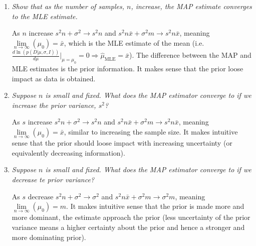 \begin{example}
\begin{enumerate}
		\item \emph{Show that as the number of samples, $n$, increase, the MAP estimate converges to the MLE estimate.}\newline
		
		As $n$ increase $s^2n+\sigma^2\rightarrow s^2n$ and $s^2n\bar{x}+\sigma^2m\rightarrow s^2n\bar{x}$, meaning $\lim\limits_{n\rightarrow \infty}(\mu_0) = \bar{x}$, which is the MLE estimate of the mean (i.e. $\frac{d\ln(p(D|\mu,\sigma,I))}{d\mu}\bigg|_{\mu=\mu_0}=0\Rightarrow \hat{\mu}_{\text{MLE}}=\bar{x}$). The difference between the MAP and MLE estimates is the prior information. It makes sense that the prior loose impact as data is obtained.
		
		\item \emph{Suppose $n$ is small and fixed. What does the MAP estimator converge to if we increase the prior variance, $s^2$?}\newline
		
		As $s$ increase $s^2n+\sigma^2\rightarrow s^2n$ and $s^2n\bar{x}+\sigma^2m\rightarrow s^2n\bar{x}$, meaning $\lim\limits_{n\rightarrow \infty}(\mu_0) = \bar{x}$, similar to increasing the sample size. It makes intuitive sense that the prior should loose impact with increasing uncertainty (or equivalently decreasing information).
		
		\item \emph{Suppose $n$ is small and fixed. What does the MAP estimator converge to if we decrease te prior variance?}\newline
		
		As $s$ decrease $s^2n+\sigma^2\rightarrow \sigma^2$ and $s^2n\bar{x}+\sigma^2m\rightarrow \sigma^2m$, meaning $\lim\limits_{n\rightarrow \infty}(\mu_0) = m$. It makes intuitive sense that the prior is made more and more dominant, the estimate approach the prior (less uncertainty of the prior variance means a higher certainty about the prior and hence a stronger and more dominating prior).
		
	\end{enumerate}
\end{example}



